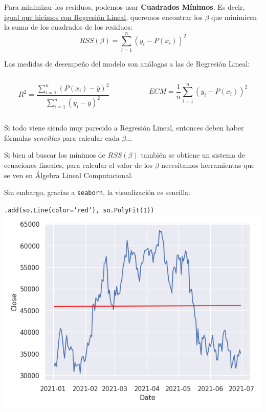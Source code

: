\documentclass[aspectratio=169, usenames,dvipsnames]{beamer}
\begin{document}
\begin{frame}
    Para minimizar los residuos, podemos usar \textbf{Cuadrados Mínimos}. Es decir, \underline{igual que hicimos con Regresión Lineal}, queremos encontrar los $\beta$ que minimicen la suma de los cuadrados de los residuos:
    \[RSS(\beta) = \displaystyle\sum_{i=1}^n (y_i - P(x_i))^2\]

    \pause
    \vspace{1em}
    Las medidas de desempeño del modelo son análogas a las de Regresión Lineal:
    \vspace{0.5em}
    \begin{columns}
        \begin{column}{0.5\textwidth}
            \[R^2 = \dfrac{\sum_{i=1}^n (P(x_i) - \bar{y})^2}{\sum_{i=1}^n (y_i - \bar{y})^2}\]
        \end{column}
        \begin{column}{0.5\textwidth}
            \[ECM = \dfrac{1}{n}\sum_{i=1}^n (y_i - P(x_i))^2\]
        \end{column}

    \end{columns}
\end{frame}

\begin{frame}
    Si todo viene siendo muy parecido a Regresión Lineal, entonces deben haber fórmulas \textit{sencillas} para calcular cada $\beta$...

    \vspace{2em}
    \pause
    Si bien al buscar los mínimos de $RSS(\beta)$ también se obtiene un sistema de ecuaciones lineales, para calcular el valor de los $\beta$ necesitamos herramientas que se ven en \alert{Álgebra Lineal Computacional}.

    \vspace{2em}

    Sin embargo, gracias a \texttt{seaborn}, la visualización es sencilla:
\end{frame}

\begin{frame}
    \centering
    \texttt{.add(so.Line(color='red'), so.PolyFit(1))}
    \includegraphics[width=0.75\linewidth]{img/bitcoin_lr.png}
\end{frame}
\end{document}
